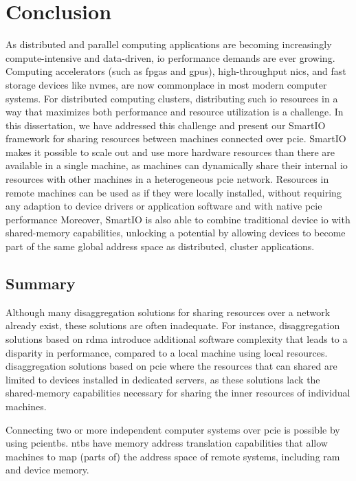 \chapter{Conclusion}\label{chapter:conclusion}
As distributed and parallel computing applications are becoming increasingly compute-intensive and data-driven, \gls{io} performance demands are ever growing.
%
Computing accelerators (such as \glspl{fpga} and \glspl{gpu}), high-throughput \glspl{nic}, and fast storage devices like \glspl{nvme}, are now commonplace in most modern computer systems.
%
For distributed computing clusters, distributing such \gls{io} resources in a way that maximizes both performance and resource utilization is a challenge.
%
In this dissertation, we have addressed this challenge and present our SmartIO framework for sharing resources between machines connected over \gls{pcie}.
%
SmartIO makes it possible to scale out and use more hardware resources than there are available in a single machine, as  machines can dynamically share their internal \gls{io} resources with other machines in a heterogeneous \gls{pcie} network.
%
Resources in remote machines can be used as if they were locally installed, without requiring any adaption to device drivers or application software and with native \gls{pcie} performance
%
Moreover, SmartIO is also able to combine traditional device \gls{io} with shared-memory capabilities, unlocking a potential by allowing devices to become part of the same global address space as distributed, cluster applications.




\section{Summary}
Although many \gls{disaggregation} solutions for sharing resources over a network already exist, these solutions are often inadequate.
%
For instance, \gls{disaggregation} solutions based on \gls{rdma} introduce additional software complexity that leads to a disparity in performance, compared to a local machine using local resources.
%
\Gls{disaggregation} solutions based on \gls{pcie}  where the resources that can shared are limited to devices installed in dedicated servers, as these solutions lack the shared-memory capabilities necessary for sharing the inner resources of individual machines.


Connecting two or more independent computer systems over \gls{pcie} is possible by using \glspl{pcientb}.
%
\Glspl{ntb} have memory address translation capabilities that allow machines to map (parts of) the address space of remote systems, including \gls{ram} and device memory.
%



